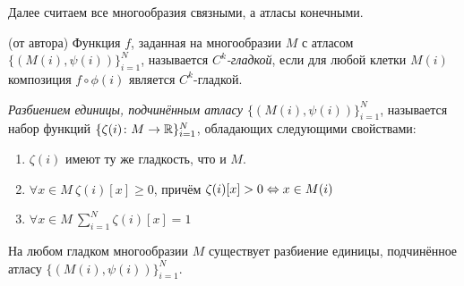 \begin{note}
	Далее считаем все многообразия связными, а атласы конечными.
\end{note}

\begin{definition} (от автора)
	Функция $f$, заданная на многообразии $M$ с атласом $\{(M(i), \psi(i))\}_{i=1}^N$, называется \textit{$C^k$-гладкой}, если для любой клетки $M(i)$ композиция $f \circ \phi(i)$ является $C^k$-гладкой.
\end{definition}

\begin{definition}
	\textit{Разбиением единицы, подчинённым атласу $\{(M(i), \psi(i))\}_{i=1}^N$}, называется набор функций $\{\zeta(i) \colon M \to \mathbb{R}\}_{i=1}^N$, обладающих следующими свойствами:
	\begin{enumerate}
		\item
		$\zeta(i)$ имеют ту же гладкость, что и $M$.
		\item
		$\forall x \in M \ \zeta(i)[x] \geq 0$, причём $\zeta(i)[x] > 0 \Leftrightarrow x \in M(i)$
		\item
		$\forall x \in M \ \sum_{i=1}^N \zeta(i)[x] = 1$
	\end{enumerate}
\end{definition}

\begin{theorem}
	На любом гладком многообразии $M$ существует разбиение единицы, подчинённое атласу $\{(M(i), \psi(i))\}_{i=1}^N$.
\end{theorem}

